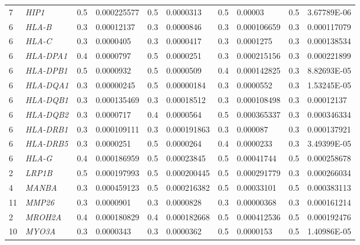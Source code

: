 \begin{refsection}
\begin{otherlanguage}{english}
\begin{scriptsize}
\begin{longtable}{llllllllll}
7 & \cellcolor[HTML]{009901}\textit{HIP1} & 0.5 & 0.000225577 & 0.5 & 0.0000313 & 0.5 & 0.00003 & 0.5 & 3.67789E-06 \\
6 & \cellcolor[HTML]{009901}\textit{HLA-B} & 0.3 & 0.00012137 & 0.3 & 0.0000846 & 0.3 & 0.000106659 & 0.3 & 0.000117079 \\
6 & \cellcolor[HTML]{009901}\textit{HLA-C} & 0.3 & 0.0000405 & 0.3 & 0.0000417 & 0.3 & 0.0001275 & 0.3 & 0.000138534 \\
6 & \cellcolor[HTML]{009901}\textit{HLA-DPA1} & 0.4 & 0.0000797 & 0.5 & 0.0000251 & 0.3 & 0.000215156 & 0.3 & 0.000221899 \\
6 & \cellcolor[HTML]{009901}\textit{HLA-DPB1} & 0.5 & 0.0000932 & 0.5 & 0.0000509 & 0.4 & 0.000142825 & 0.3 & 8.82693E-05 \\
6 & \cellcolor[HTML]{009901}\textit{HLA-DQA1} & 0.3 & 0.00000245 & 0.5 & 0.00000184 & 0.3 & 0.0000552 & 0.3 & 1.53245E-05 \\
6 & \cellcolor[HTML]{009901}\textit{HLA-DQB1} & 0.3 & 0.000135469 & 0.3 & 0.00018512 & 0.3 & 0.000108498 & 0.3 & 0.00012137 \\
6 & \cellcolor[HTML]{009901}\textit{HLA-DQB2} & 0.3 & 0.0000717 & 0.4 & 0.0000564 & 0.5 & 0.000365337 & 0.3 & 0.000346334 \\
6 & \cellcolor[HTML]{009901}\textit{HLA-DRB1} & 0.3 & 0.000109111 & 0.3 & 0.000191863 & 0.3 & 0.000087 & 0.3 & 0.000137921 \\
6 & \cellcolor[HTML]{009901}\textit{HLA-DRB5} & 0.3 & 0.0000251 & 0.5 & 0.0000264 & 0.4 & 0.0000233 & 0.3 & 3.49399E-05 \\
6 & \cellcolor[HTML]{009901}\textit{HLA-G} & 0.4 & 0.000186959 & 0.5 & 0.00023845 & 0.5 & 0.00041744 & 0.5 & 0.000258678 \\
2 & \cellcolor[HTML]{009901}\textit{LRP1B} & 0.5 & 0.000197993 & 0.5 & 0.000200445 & 0.5 & 0.000291779 & 0.3 & 0.000266034 \\
4 & \cellcolor[HTML]{009901}\textit{MANBA} & 0.3 & 0.000459123 & 0.5 & 0.000216382 & 0.5 & 0.00033101 & 0.5 & 0.000383113 \\
11 & \cellcolor[HTML]{009901}\textit{MMP26} & 0.3 & 0.0000901 & 0.3 & 0.0000828 & 0.3 & 0.00000368 & 0.3 & 0.000161214 \\
2 & \cellcolor[HTML]{009901}\textit{MROH2A} & 0.4 & 0.000180829 & 0.4 & 0.000182668 & 0.5 & 0.000412536 & 0.5 & 0.000192476 \\
10 & \cellcolor[HTML]{009901}\textit{MYO3A} & 0.3 & 0.0000343 & 0.3 & 0.0000362 & 0.5 & 0.0000153 & 0.5 & 1.40986E-05 \\

\end{longtable}
\end{scriptsize}
\end{otherlanguage}
\end{refsection}
